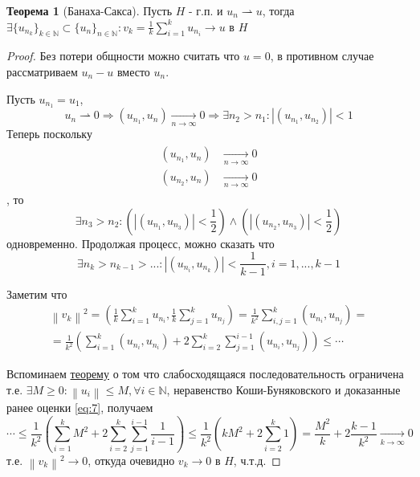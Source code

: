 \documentclass[12pt,a4paper]{article}
\theoremstyle{definition}
\newtheorem{theorem}{Теорема}
\newcommand{\Natural}{\mathbb{N}}
\newcommand{\norm}[1]{\left\lVert#1\right\rVert}
\newcommand{\seq}[2]{\{#1\}_{#2}}
\newcommand{\weakto}{\rightharpoonup}
\begin{document}
\begin{theorem}[Банаха-Сакса]\label{th:6}
	Пусть $H$ - г.п. и $u_n \weakto u$, тогда \\ $\exists\seq{u_{n_k}}{k\in\Natural} \subset \seq{u_n}{n\in\Natural}: v_k = \frac{1}{k}\sum\limits_{i=1}^{k}{u_{n_i}} \to u$ в $H$
\end{theorem}
\begin{proof}
	Без потери общности можно считать что $u = 0$, в противном случае рассматриваем $u_n - u$ вместо $u_n$. 
	
	Пусть $u_{n_1} = u_1$, 
	$$u_n \weakto 0 \Rightarrow (u_{n_1}, u_n) \xrightarrow[n \to \infty]{} 0 \Rightarrow \exists n_2 > n_1: |(u_{n_1}, u_{n_2})| < 1$$
	Теперь поскольку
	\begin{align*}
	\begin{split}
		(u_{n_1}, u_n) &\xrightarrow[n \to \infty]{} 0 \\
		(u_{n_2}, u_n) &\xrightarrow[n \to \infty]{} 0
	\end{split}
	\end{align*}
	, то 
	$$\exists n_3 > n_2: \left( |(u_{n_1}, u_{n_3})| < \frac{1}{2} \right) \wedge \left( |(u_{n_2}, u_{n_3})| < \frac{1}{2} \right)$$
	одновременно. Продолжая процесс, можно сказать что 
	\begin{equation}\label{eq:7}
		\exists n_k > n_{k-1} > ...: |(u_{n_i}, u_{n_k})| < \frac{1}{k-1}, i = 1, ..., k-1
	\end{equation}
	
	Заметим что
	\begin{multline*}
		\norm{v_k}^2 = \left(\frac{1}{k} \sum_{i=1}^{k}{u_{n_i}}, \frac{1}{k} \sum_{j=1}^{k}{u_{n_j}} \right) = \frac{1}{k^2}\sum_{i,j=1}^{k}{(u_{n_i}, u_{n_j})} = \\ = \frac{1}{k^2}\left( \sum_{i=1}^{k}{(u_{n_i}, u_{n_i})} + 2\sum_{i=2}^{k}{\sum_{j=1}^{i-1}{(u_{n_i}, u_{n_j})}} \right) \leq \cdots
	\end{multline*}
	
	Вспоминаем \hyperref[th:5]{теорему} о том что слабосходящаяся последовательность ограничена т.е. $\exists M \geq 0: \norm{u_i} \leq M, \forall i \in \Natural$, неравенство Коши-Буняковского и доказанные ранее оценки \eqref{eq:7}, получаем
	\begin{equation*}
		\cdots \leq \frac{1}{k^2}\left(\sum_{i=1}^{k}{M^2} + 2\sum_{i=2}^{k}{\sum_{j=1}^{i-1}{\frac{1}{i-1}}}\right) \leq
		\frac{1}{k^2}\left( kM^2 + 2\sum_{i=2}^{k}{1}\right) = \frac{M^2}{k} + 2\frac{k-1}{k^2} \xrightarrow[k \to \infty]{} 0
	\end{equation*}
	т.е. $\norm{v_k}^2 \to 0$, откуда очевидно $v_k \to 0$ в $H$, ч.т.д.
\end{proof}
\end{document}
